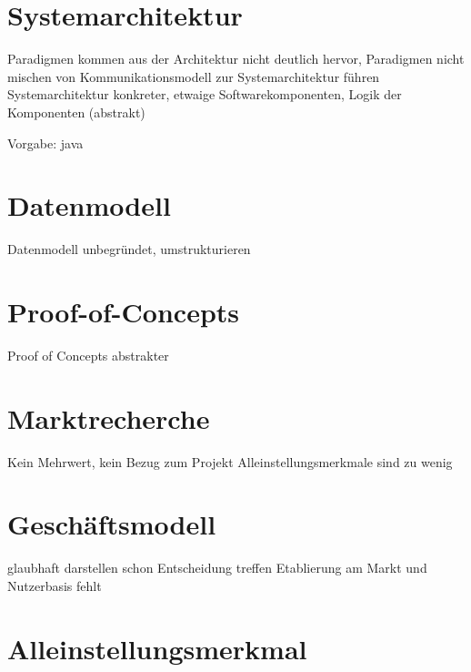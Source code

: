 \documentclass[12pt]{scrartcl}
\begin{document}

\section{Systemarchitektur}

Paradigmen kommen aus der Architektur nicht deutlich hervor, Paradigmen nicht mischen
von Kommunikationsmodell zur Systemarchitektur führen
Systemarchitektur konkreter, etwaige Softwarekomponenten, Logik der Komponenten (abstrakt)

Vorgabe: java


\section{Datenmodell}

Datenmodell unbegründet, umstrukturieren


\section{Proof-of-Concepts}

Proof of Concepts abstrakter


\section{Marktrecherche}

Kein Mehrwert, kein Bezug zum Projekt
Alleinstellungsmerkmale sind zu wenig


\section{Geschäftsmodell}

glaubhaft darstellen
schon Entscheidung treffen
Etablierung am Markt und Nutzerbasis fehlt


\section{Alleinstellungsmerkmal}
\end{document}
